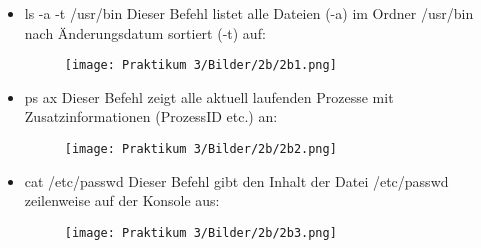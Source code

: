 \documentclass[12pt]{article}
\begin{document}
\begin{itemize}
\item ls -a -t /usr/bin\newline
\newline
Dieser Befehl listet alle Dateien (-a) im Ordner /usr/bin nach Änderungsdatum sortiert (-t) auf:
\begin{figure}[htbp]
    \centering
    \texttt{[image: Praktikum 3/Bilder/2b/2b1.png]}
\end{figure}

\item ps ax\newline
\newline
Dieser Befehl zeigt alle aktuell laufenden Prozesse mit Zusatzinformationen (ProzessID etc.) an:
\begin{figure}[htbp]
    \centering
    \texttt{[image: Praktikum 3/Bilder/2b/2b2.png]}
\end{figure}

\item cat /etc/passwd \newline
\newline
Dieser Befehl gibt den Inhalt der Datei /etc/passwd zeilenweise auf der Konsole aus:
\begin{figure}[htbp]
    \centering
    \texttt{[image: Praktikum 3/Bilder/2b/2b3.png]}
\end{figure}

\end{itemize}
\end{document}
